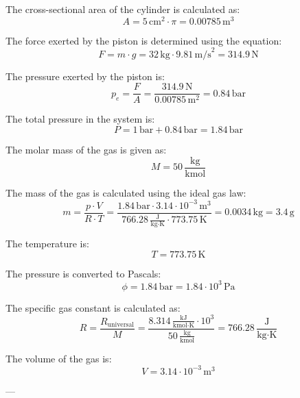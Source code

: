 The cross-sectional area of the cylinder is calculated as:  
\[
A = 5 \, \text{cm}^2 \cdot \pi = 0.00785 \, \text{m}^3
\]  

The force exerted by the piston is determined using the equation:  
\[
F = m \cdot g = 32 \, \text{kg} \cdot 9.81 \, \text{m/s}^2 = 314.9 \, \text{N}
\]  

The pressure exerted by the piston is:  
\[
p_e = \frac{F}{A} = \frac{314.9 \, \text{N}}{0.00785 \, \text{m}^2} = 0.84 \, \text{bar}
\]  

The total pressure in the system is:  
\[
P = 1 \, \text{bar} + 0.84 \, \text{bar} = 1.84 \, \text{bar}
\]  

The molar mass of the gas is given as:  
\[
M = 50 \, \frac{\text{kg}}{\text{kmol}}
\]  

The mass of the gas is calculated using the ideal gas law:  
\[
m = \frac{p \cdot V}{R \cdot T} = \frac{1.84 \, \text{bar} \cdot 3.14 \cdot 10^{-3} \, \text{m}^3}{766.28 \, \frac{\text{J}}{\text{kg·K}} \cdot 773.75 \, \text{K}} = 0.0034 \, \text{kg} = 3.4 \, \text{g}
\]  

The temperature is:  
\[
T = 773.75 \, \text{K}
\]  

The pressure is converted to Pascals:  
\[
\phi = 1.84 \, \text{bar} = 1.84 \cdot 10^3 \, \text{Pa}
\]  

The specific gas constant is calculated as:  
\[
R = \frac{R_{\text{universal}}}{M} = \frac{8.314 \, \frac{\text{kJ}}{\text{kmol·K}} \cdot 10^3}{50 \, \frac{\text{kg}}{\text{kmol}}} = 766.28 \, \frac{\text{J}}{\text{kg·K}}
\]  

The volume of the gas is:  
\[
V = 3.14 \cdot 10^{-3} \, \text{m}^3
\]  

---